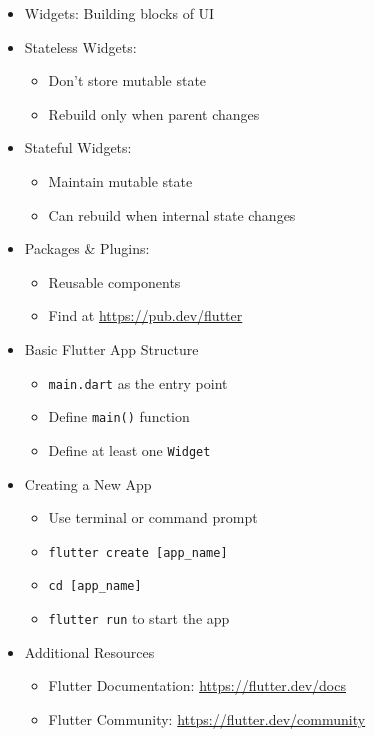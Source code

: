 \documentclass{article}
\begin{document}
\begin{itemize}
    \item Widgets: Building blocks of UI
    \item Stateless Widgets:
    \begin{itemize}
        \item Don't store mutable state
        \item Rebuild only when parent changes
    \end{itemize}
    \item Stateful Widgets:
    \begin{itemize}
        \item Maintain mutable state
        \item Can rebuild when internal state changes
    \end{itemize}
    \item Packages \& Plugins:
    \begin{itemize}
        \item Reusable components
        \item Find at \url{https://pub.dev/flutter}
    \end{itemize}

    \item Basic Flutter App Structure
    \begin{itemize}
        \item \texttt{main.dart} as the entry point
        \item Define \texttt{main()} function
        \item Define at least one \texttt{Widget}
    \end{itemize}

    \item Creating a New App
    \begin{itemize}
        \item Use terminal or command prompt
        \item \texttt{flutter create [app\_name]}
        \item \texttt{cd [app\_name]}
        \item \texttt{flutter run} to start the app
    \end{itemize}

    \item Additional Resources
    \begin{itemize}
        \item Flutter Documentation: \url{https://flutter.dev/docs}
        \item Flutter Community: \url{https://flutter.dev/community}
    \end{itemize}
\end{itemize}
\newpage
\end{document}
